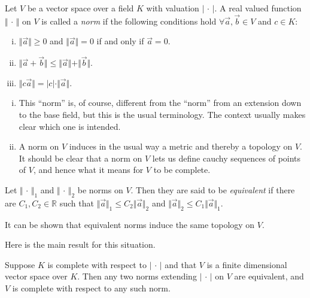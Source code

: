 \begin{defi}
\label{d3.3.2}
Let $V$ be a vector space over a field $K$ with valuation $|\, \cdot\, |$. A real valued function $\Vert\, \cdot\, \Vert$ on $V$ is called a {\it norm} if the following conditions hold $\forall\vec{a},\vec{b}\in V$ and $c\in K$:
\begin{enumerate}[(i)]
\item
$\Vert\vec{a}\Vert\geq 0$ and $\Vert\vec{a}\Vert=0$ if and only if $\vec{a}=0$.
\item
$\Vert\vec{a}+\vec{b}\Vert\leq\Vert\vec{a}\Vert+\Vert\vec{b}\Vert$.
\item
$\Vert c\vec{a}\Vert=|c|\cdot\Vert\vec{a}\Vert$.
\end{enumerate}
\end{defi}

\rems
\begin{enumerate}[(i)]
\item
This ``norm'' is, of course, different from the ``norm'' from an extension down to the base field, but this is the usual terminology. The context usually makes clear which one is intended.
\item
A norm on $V$ induces in the usual way a metric and thereby a topology on $V$. It should be clear that a norm on $V$ lets us define cauchy sequences of points of $V$, and hence what it means for $V$ to be complete.
\end{enumerate}

\begin{defi}
\label{d3.3.3}
Let $\Vert\, \cdot\, \Vert_{1}$ and $\Vert\, \cdot\, \Vert_{2}$ be norms on $V$. Then they are said to be {\it equivalent} if there are $C_{1},C_{2}\in \mathbb{R}$ such that $\Vert\vec{a}\Vert_{1}\leq C_{2}\Vert\vec{a}\Vert_{2}$ and $\Vert\vec{a}\Vert_{2}\leq C_{1}\Vert\vec{a}\Vert_{1}$.
\end{defi}

\rem
It can be shown that equivalent norms induce the same topology on $V$.

Here is the main result for this situation.

\begin{theo}
\label{t3.3.5}
Suppose $K$ is complete with respect to $|\, \cdot \, |$ and that $V$ is a finite dimensional vector space over $K$. Then any two norms extending  $|\, \cdot \, |$ on $V$ are equivalent, and $V$ is complete with respect to any such norm.
\end{theo}

